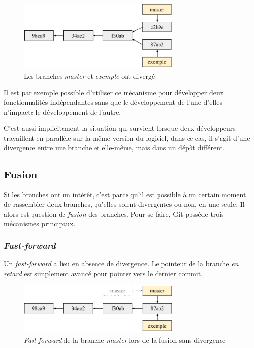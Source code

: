 \documentclass[11pt,a4paper]{article}
\begin{document}
\begin{figure}[h]
\begin{center}
\includegraphics[width=8cm]{img_divergence}
\caption{Les branches \textit{master} et \textit{exemple} ont divergé}
\end{center}
\end{figure}

Il est par exemple possible d'utiliser ce mécanisme pour développer deux fonctionnalités indépendantes sans que le développement de l'une d'elles n'impacte le développement de l'autre.

C'est aussi implicitement la situation qui survient lorsque deux développeurs travaillent en parallèle sur la même version du logiciel, dans ce cas, il s'agit d'une divergence entre une branche et elle-même, mais dans un dépôt différent.

\subsection{Fusion}

Si les branches ont un intérêt, c'est parce qu'il est possible à un certain moment de rassembler deux branches, qu'elles soient divergentes ou non, en une seule. Il alors est question de \textit{fusion} des branches. Pour se faire, Git possède trois mécanismes principaux.

\subsubsection{\textit{Fast-forward}}

Un \textit{fast-forward} a lieu en absence de divergence. Le pointeur de la branche \textit{en retard} est simplement avancé pour pointer vers le dernier commit.

\begin{figure}[h]
\begin{center}
\includegraphics[width=8cm]{img_fastf}
\caption{\textit{Fast-forward} de la branche \textit{master} lors de la fusion sans divergence}
\end{center}
\end{figure}
\end{document}
